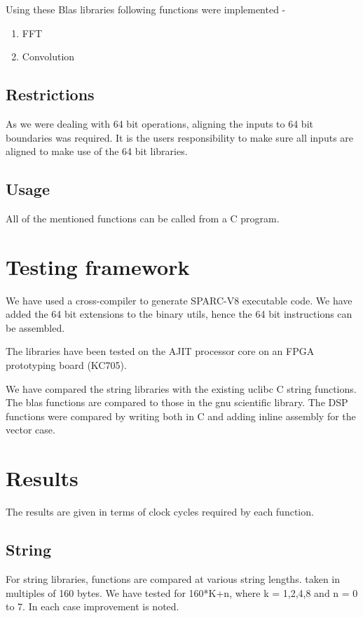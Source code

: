 \documentclass[12pt]{article}
\begin{document}
Using these Blas libraries following functions were implemented - 
\begin{enumerate}
    \item FFT
    \item Convolution
\end{enumerate}

\subsection{Restrictions}

As we were dealing with 64 bit operations, aligning the inputs to 64 bit boundaries was required. It is the users responsibility to make sure all inputs are aligned to make use of the 64 bit libraries.

\subsection{Usage}

All of the mentioned functions can be called from a C program. 

\section{Testing framework}


We have used a cross-compiler to generate SPARC-V8 executable code.
We have added  the 64 bit extensions to the binary utils, hence the 64 bit instructions can be assembled.

The libraries have been tested on the AJIT processor core on an FPGA prototyping board (KC705).

We have compared the string libraries with the existing uclibc C string functions. The blas functions are compared to those in the gnu scientific library. The DSP functions were compared by writing both in C and adding inline assembly for the vector case.

\section{Results}
The results are given in terms of clock cycles required by each function.  

\subsection{String}

For string libraries, functions are compared at various string lengths. taken in multiples of 160 bytes. We have tested for 160*K+n, where k = 1,2,4,8 and n = 0 to 7. In each case improvement is noted.
\end{document}
